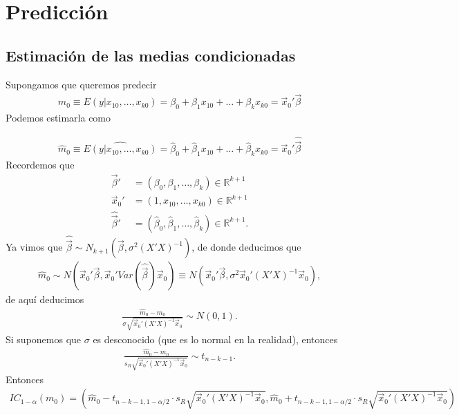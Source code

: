 \section{Predicción}

\subsection{Estimación de las medias condicionadas}
Supongamos que queremos predecir
\begin{align*}
    m_0 \equiv E(y | x_{10},\ldots,x_{k0}) = \beta_0 + \beta_1 x_{10} + \ldots + \beta_kx_{k0} = \vec{x}_0' \vec{\beta}
\end{align*}
Podemos estimarla como

\begin{align*}
    \widehat{m}_0 \equiv \widehat{E(y | x_{10},\ldots,x_{k0})} = \widehat{\beta}_0 + \widehat{\beta}_1 x_{10} + \ldots + \widehat{\beta}_kx_{k0} = \vec{x}_0' \widehat{\vec{\beta}}
\end{align*}
Recordemos que
\begin{align*}
    \vec{\beta}'           & = (\beta_0,\beta_1,\ldots,\beta_k) \in \mathbb{R}^{k+1}                                   \\
    \vec{x}_0'             & = (1,x_{10},\ldots,x_{k0}) \in \mathbb{R}^{k+1}                                           \\
    \widehat{\vec{\beta}}' & = (\widehat{\beta}_0, \widehat{\beta}_1, \ldots, \widehat{\beta}_k) \in \mathbb{R}^{k+1}.
\end{align*}
Ya vimos que $\widehat{\vec{\beta}} \sim N_{k+1}\left( \vec{\beta}, \sigma^2(X'X)^{-1} \right)$, de donde deducimos que
\begin{align*}
    \widehat{m}_0 \sim N\left( \vec{x}_0'\vec{\beta}, \vec{x}_0'Var\left(\widehat{\vec{\beta}}\right)\vec{x}_0 \right) \equiv N\left( \vec{x}_0'\vec{\beta}, \sigma^2\vec{x}_0'(X'X)^{-1}\vec{x}_0 \right),
\end{align*}
de aquí deducimos
\begin{align*}
    \frac{\widehat{m}_0 - m_0}{\sigma \sqrt{\vec{x}_0'(X'X)^{-1}\vec{x}_0}} \sim N(0,1).
\end{align*}
Si suponemos que $\sigma$ es desconocido (que es lo normal en la realidad), entonces
\begin{align*}
    \frac{\widehat{m}_0 - m_0}{s_R \sqrt{\vec{x}_0'(X'X)^{-1}\vec{x}_0}} \sim t_{n-k-1}.
\end{align*}
Entonces
\begin{align*}
    IC_{1-\alpha}(m_0) = \left( \widehat{m}_0 - t_{n-k-1,1-\alpha/2} \cdot s_R \sqrt{\vec{x}_0'(X'X)^{-1}\vec{x}_0}, \widehat{m}_0 + t_{n-k-1,1-\alpha/2} \cdot s_R \sqrt{\vec{x}_0'(X'X)^{-1}\vec{x}_0} \right)
\end{align*}

